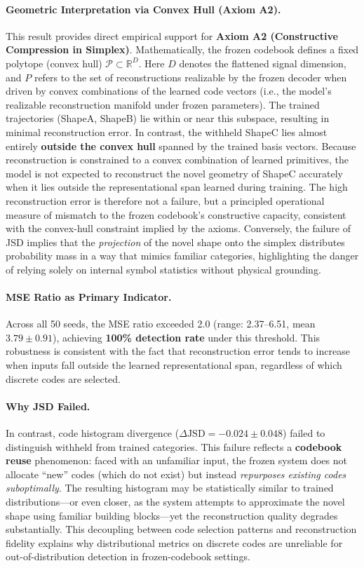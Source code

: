 \documentclass{article}
\begin{document}
\paragraph{Geometric Interpretation via Convex Hull (Axiom A2).}
This result provides direct empirical support for \textbf{Axiom A2 (Constructive Compression in Simplex)}.
Mathematically, the frozen codebook defines a fixed polytope (convex hull) $\mathcal{P} \subset \mathbb{R}^D$.
Here \(D\) denotes the flattened signal dimension, and \(P\) refers to the set of reconstructions realizable by the frozen decoder when driven by convex combinations of the learned code vectors (i.e., the model’s realizable reconstruction manifold under frozen parameters).
The trained trajectories (ShapeA, ShapeB) lie within or near this subspace, resulting in minimal reconstruction error.
In contrast, the withheld ShapeC lies almost entirely \textbf{outside the convex hull} spanned by the trained basis vectors.
Because reconstruction is constrained to a convex combination of learned primitives, the model is not expected to reconstruct the novel geometry of ShapeC accurately when it lies outside the representational span learned during training.
The high reconstruction error is therefore not a failure, but a principled operational measure of mismatch to the frozen codebook’s constructive capacity, consistent with the convex-hull constraint implied by the axioms.
Conversely, the failure of JSD implies that the \emph{projection} of the novel shape onto the simplex distributes probability mass in a way that mimics familiar categories, highlighting the danger of relying solely on internal symbol statistics without physical grounding.

\paragraph{MSE Ratio as Primary Indicator.}
Across all 50 seeds, the MSE ratio exceeded 2.0 (range: 2.37--6.51, mean $3.79 \pm 0.91$), achieving \textbf{100\% detection rate} under this threshold.
This robustness is consistent with the fact that reconstruction error tends to increase when inputs fall outside the learned representational span, regardless of which discrete codes are selected.

\paragraph{Why JSD Failed.}
In contrast, code histogram divergence ($\Delta\mathrm{JSD} = -0.024 \pm 0.048$) failed to distinguish withheld from trained categories.
This failure reflects a \textbf{codebook reuse} phenomenon: faced with an unfamiliar input, the frozen system does not allocate ``new'' codes (which do not exist) but instead \emph{repurposes existing codes suboptimally}.
The resulting histogram may be statistically similar to trained distributions---or even closer, as the system attempts to approximate the novel shape using familiar building blocks---yet the reconstruction quality degrades substantially.
This decoupling between code selection patterns and reconstruction fidelity explains why distributional metrics on discrete codes are unreliable for out-of-distribution detection in frozen-codebook settings.
\end{document}
